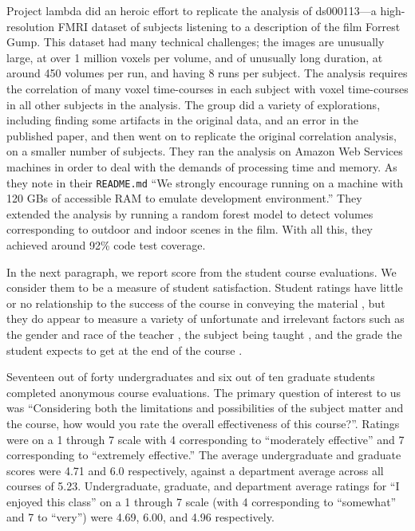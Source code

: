 Project lambda did an heroic effort to replicate the analysis of ds000113---a
high-resolution FMRI dataset of subjects listening to a description of the
film Forrest Gump.  This dataset had many technical challenges; the images are
unusually large, at over 1 million voxels per volume, and of unusually long
duration, at around 450 volumes per run, and having 8 runs per subject.  The
analysis requires the correlation of many voxel time-courses in each subject
with voxel time-courses in all other subjects in the analysis.  The group did
a variety of explorations, including finding some artifacts in the original
data, and an error in the published paper, and then went on to replicate the
original correlation analysis, on a smaller number of subjects.  They ran the
analysis on Amazon Web Services machines in order to deal with the demands of
processing time and memory.  As they note in their \texttt{README.md} ``We
strongly encourage running on a machine with 120 GBs of accessible RAM to
emulate development environment.'' They extended the analysis by running a
random forest model to detect volumes corresponding to outdoor and indoor
scenes in the film.  With all this, they achieved around 92\% code test
coverage.

In the next paragraph, we report score from the student course evaluations.
We consider them to be a measure of student satisfaction.  Student ratings
have little or no relationship to the success of the course in conveying the
material \cite{uttl2017meta, boring2016student}, but they do appear to measure
a variety of unfortunate and irrelevant factors such as the gender and race of
the teacher \cite{boring2016student}, the subject being taught
\cite{uttl2017student}, and the grade the student expects to get at the end of
the course \cite{krautmann1999grades, worthington2002impact}.

Seventeen out of forty undergraduates and six out of ten graduate students
completed anonymous course evaluations.  The primary question of interest to
us was ``Considering both the limitations and possibilities of the subject
matter and the course, how would you rate the overall effectiveness of this
course?''.  Ratings were on a 1 through 7 scale with 4 corresponding to
``moderately effective'' and 7 corresponding to ``extremely effective.'' The
average undergraduate and graduate scores were 4.71 and 6.0 respectively,
against a department average across all courses of 5.23.  Undergraduate,
graduate, and department average ratings for ``I enjoyed this class'' on a 1
through 7 scale (with 4 corresponding to ``somewhat'' and 7 to ``very'') were
4.69, 6.00, and 4.96 respectively.

